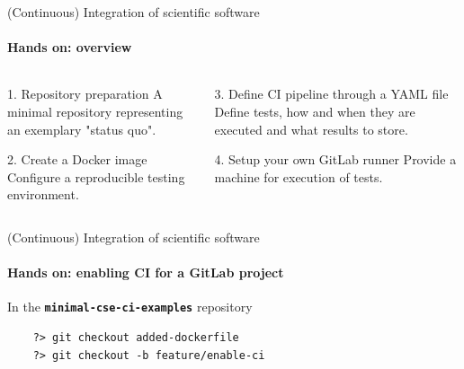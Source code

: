 \begin{frame}{(Continuous) Integration of scientific software}
    \framesubtitle{Hands on: overview}
    \begin{columns}
    \begin{column}{0.48\textwidth}
        \begin{block}{1. Repository preparation}
            A minimal repository representing an exemplary
            "status quo".
        \end{block}
        \begin{block}{2. Create a Docker image}
            Configure a reproducible testing environment.
        \end{block}
    \end{column}

    \begin{column}{0.48\textwidth}
        \begin{exampleblock}{3. Define CI pipeline through a YAML file}
            Define tests, how and when they are executed and what
            results to store.
        \end{exampleblock}
        \begin{block}{4. Setup your own GitLab runner}
            Provide a machine for execution of tests.
        \end{block}
    \end{column}
    \end{columns}
\end{frame}

\begin{frame}[fragile]{(Continuous) Integration of scientific software} 
    \framesubtitle{Hands on: enabling CI for a GitLab project } 

    \vfill

    In the \textbf{\texttt{minimal-cse-ci-examples}} repository

    \begin{verbatim}
    ?> git checkout added-dockerfile 
    ?> git checkout -b feature/enable-ci
    \end{verbatim}

\end{frame}

